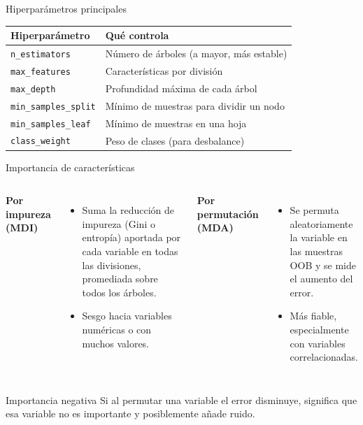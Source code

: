 \documentclass[aspectratio=169, 10pt, xcolor=table]{beamer}
\begin{document}
\begin{frame}{Hiperparámetros principales}
    \begin{table}
        \centering
        \begin{tabular}{l|l}
            \toprule
            \textbf{Hiperparámetro} & \textbf{Qué controla} \\
            \midrule
            \texttt{n\_estimators} & Número de árboles (a mayor, más estable) \\
            \texttt{max\_features} & Características por división \\
            \texttt{max\_depth} & Profundidad máxima de cada árbol \\
            \texttt{min\_samples\_split} & Mínimo de muestras para dividir un nodo \\
            \texttt{min\_samples\_leaf} & Mínimo de muestras en una hoja \\
            \texttt{class\_weight} & Peso de clases (para desbalance) \\
            \bottomrule
        \end{tabular}
    \end{table}
\end{frame}

\begin{frame}{Importancia de características}
    \begin{columns}[t]
        \textbf{Por impureza (MDI)}
        \begin{itemize}
            \item Suma la reducción de impureza (Gini o entropía) aportada por cada variable en todas las divisiones, promediada sobre todos los árboles.
            \item Sesgo hacia variables numéricas o con muchos valores.
        \end{itemize}
        \textbf{Por permutación (MDA)}
        \begin{itemize}
            \item Se permuta aleatoriamente la variable en las muestras OOB y se mide el aumento del error.
            \item Más fiable, especialmente con variables correlacionadas.
        \end{itemize}
    \end{columns}
    \vspace{0.3cm}
    \begin{alertblock}{Importancia negativa}
        Si al permutar una variable el error disminuye, significa que esa variable no es importante y posiblemente añade ruido.
    \end{alertblock}
\end{frame}
\end{document}
